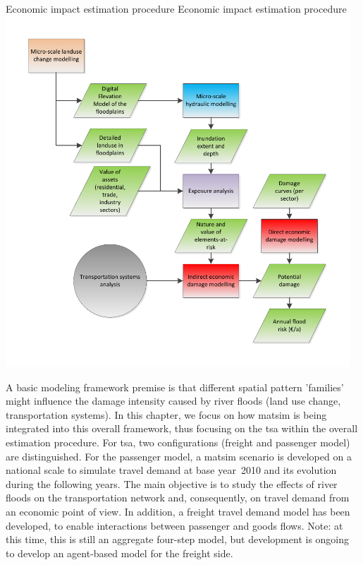 \createfigure%
{Economic impact estimation procedure}%
{Economic impact estimation procedure}%
{\label{fig:belgium_fig1}}%
{\includegraphics[width=0.97\textwidth, angle=0]{scenarios/figures/belgium_fig1.pdf}}%
{}

A basic modeling framework premise is that different spatial pattern 'families' might influence the damage intensity caused by river floods (\eg land use change, transportation systems). 
In this chapter, we focus on how \gls{matsim} is being integrated into this overall framework, thus focusing on the \gls{tsa} within the overall estimation procedure. 
For \gls{tsa}, two configurations (freight and passenger model) are distinguished. 
For the passenger model, a \gls{matsim} scenario is developed on a national scale to simulate travel demand at base year~2010 and its evolution during the following years. 
The main objective is to study the effects of river floods on the transportation network and, consequently, on travel demand from an economic point of view. 
In addition, a freight travel demand model has been developed, to enable interactions between passenger and goods flows. 
Note: at this time, this is still an aggregate four-step model, but development is ongoing to develop an agent-based model for the freight side.  

